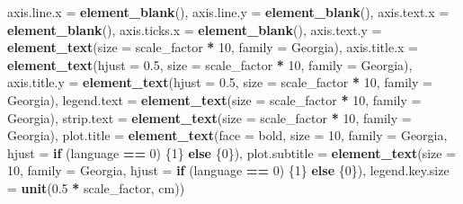 \documentclass[
]{article}
\newenvironment{Shaded}{\begin{snugshade}}{\end{snugshade}}
\newcommand{\AttributeTok}[1]{\textcolor[rgb]{0.13,0.29,0.53}{#1}}
\newcommand{\ControlFlowTok}[1]{\textcolor[rgb]{0.13,0.29,0.53}{\textbf{#1}}}
\newcommand{\DecValTok}[1]{\textcolor[rgb]{0.00,0.00,0.81}{#1}}
\newcommand{\FloatTok}[1]{\textcolor[rgb]{0.00,0.00,0.81}{#1}}
\newcommand{\FunctionTok}[1]{\textcolor[rgb]{0.13,0.29,0.53}{\textbf{#1}}}
\newcommand{\NormalTok}[1]{#1}
\newcommand{\SpecialCharTok}[1]{\textcolor[rgb]{0.81,0.36,0.00}{\textbf{#1}}}
\newcommand{\StringTok}[1]{\textcolor[rgb]{0.31,0.60,0.02}{#1}}
\begin{document}
\begin{Shaded}
\begin{Highlighting}[]
        \AttributeTok{axis.line.x =} \FunctionTok{element\_blank}\NormalTok{(),}
        \AttributeTok{axis.line.y =} \FunctionTok{element\_blank}\NormalTok{(),}
        \AttributeTok{axis.text.x =} \FunctionTok{element\_blank}\NormalTok{(),}
        \AttributeTok{axis.ticks.x =} \FunctionTok{element\_blank}\NormalTok{(),}
        \AttributeTok{axis.text.y =} \FunctionTok{element\_text}\NormalTok{(}\AttributeTok{size =}\NormalTok{ scale\_factor }\SpecialCharTok{*} \DecValTok{10}\NormalTok{, }\AttributeTok{family =} \StringTok{\textquotesingle{}Georgia\textquotesingle{}}\NormalTok{),}
        \AttributeTok{axis.title.x =} \FunctionTok{element\_text}\NormalTok{(}\AttributeTok{hjust =} \FloatTok{0.5}\NormalTok{, }\AttributeTok{size =}\NormalTok{ scale\_factor }\SpecialCharTok{*} \DecValTok{10}\NormalTok{, }\AttributeTok{family =} \StringTok{\textquotesingle{}Georgia\textquotesingle{}}\NormalTok{),}
        \AttributeTok{axis.title.y =} \FunctionTok{element\_text}\NormalTok{(}\AttributeTok{hjust =} \FloatTok{0.5}\NormalTok{, }\AttributeTok{size =}\NormalTok{ scale\_factor }\SpecialCharTok{*} \DecValTok{10}\NormalTok{, }\AttributeTok{family =} \StringTok{\textquotesingle{}Georgia\textquotesingle{}}\NormalTok{),}
        \AttributeTok{legend.text =} \FunctionTok{element\_text}\NormalTok{(}\AttributeTok{size =}\NormalTok{ scale\_factor }\SpecialCharTok{*} \DecValTok{10}\NormalTok{, }\AttributeTok{family =} \StringTok{\textquotesingle{}Georgia\textquotesingle{}}\NormalTok{),}
        \AttributeTok{strip.text =} \FunctionTok{element\_text}\NormalTok{(}\AttributeTok{size =}\NormalTok{ scale\_factor }\SpecialCharTok{*} \DecValTok{10}\NormalTok{, }\AttributeTok{family =} \StringTok{\textquotesingle{}Georgia\textquotesingle{}}\NormalTok{),}
        \AttributeTok{plot.title =} \FunctionTok{element\_text}\NormalTok{(}\AttributeTok{face =} \StringTok{\textquotesingle{}bold\textquotesingle{}}\NormalTok{, }\AttributeTok{size =} \DecValTok{10}\NormalTok{, }\AttributeTok{family =} \StringTok{\textquotesingle{}Georgia\textquotesingle{}}\NormalTok{, }\AttributeTok{hjust =} \ControlFlowTok{if}\NormalTok{ (language }\SpecialCharTok{==} \DecValTok{0}\NormalTok{) \{}\DecValTok{1}\NormalTok{\} }\ControlFlowTok{else}\NormalTok{ \{}\DecValTok{0}\NormalTok{\}),}
        \AttributeTok{plot.subtitle =} \FunctionTok{element\_text}\NormalTok{(}\AttributeTok{size =} \DecValTok{10}\NormalTok{, }\AttributeTok{family =} \StringTok{\textquotesingle{}Georgia\textquotesingle{}}\NormalTok{, }\AttributeTok{hjust =} \ControlFlowTok{if}\NormalTok{ (language }\SpecialCharTok{==} \DecValTok{0}\NormalTok{) \{}\DecValTok{1}\NormalTok{\} }\ControlFlowTok{else}\NormalTok{ \{}\DecValTok{0}\NormalTok{\}),}
        \AttributeTok{legend.key.size =} \FunctionTok{unit}\NormalTok{(}\FloatTok{0.5} \SpecialCharTok{*}\NormalTok{ scale\_factor, }\StringTok{\textquotesingle{}cm\textquotesingle{}}\NormalTok{))}


\end{Highlighting}
\end{Shaded}
\end{document}
